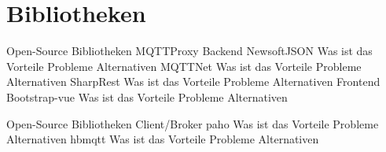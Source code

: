 \section{Bibliotheken}
    Open-Source Bibliotheken MQTTProxy
    Backend
        NewsoftJSON
            Was ist das
            Vorteile
            Probleme
            Alternativen
        MQTTNet
            Was ist das
            Vorteile
            Probleme
            Alternativen
        SharpRest
            Was ist das
            Vorteile
            Probleme
            Alternativen
    Frontend
        Bootstrap-vue
            Was ist das
            Vorteile
            Probleme
            Alternativen
            
    Open-Source Bibliotheken Client/Broker
        paho
            Was ist das
            Vorteile
            Probleme
            Alternativen
        hbmqtt
            Was ist das
            Vorteile
            Probleme
            Alternativen